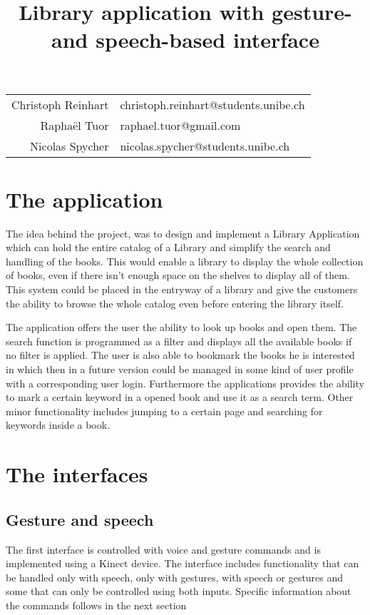 \documentclass[a4paper, 10pt]{article}
\begin{document}
	\title{Library application with gesture- and speech-based interface}
	\maketitle
	
	\begin{tabular}{rl}
		Christoph Reinhart  & christoph.reinhart@students.unibe.ch\\
		Raphaël Tuor  & raphael.tuor@gmail.com\\
		Nicolas Spycher & nicolas.spycher@students.unibe.ch
	\end{tabular}
	
	\newpage	
	\section{The application}
	
	\par{The idea behind the project, was to design and implement a Library Application which can hold the entire catalog of a Library and simplify the search and handling of the books. This would enable a library to display the whole collection of books, even if there isn't enough space on the shelves to display all of them. This system could be placed in the entryway of a library and give the customers the ability to browse the whole catalog even before entering the library itself.}
	\par{The application offers the user the ability to look up books and open them. The search function is programmed as a filter and displays all the available books if no filter is applied. The user is also able to bookmark the books he is interested in which then in a future version could be managed in some kind of user profile with a corresponding user login. Furthermore the applications provides the ability to mark a certain keyword in a opened book and use it as a search term. Other minor functionality includes jumping to a certain page and searching for keywords inside a book.}
	
	
	\section{The interfaces}
	
	\subsection{Gesture and speech}
	
	\par{The first interface is controlled with voice and gesture commands and is implemented using a Kinect device. The interface includes functionality that can be handled only with speech, only with gestures, with speech or gestures and some that can only be controlled using both inputs. Specific information about the commands follows in the next section}
	
\end{document}
